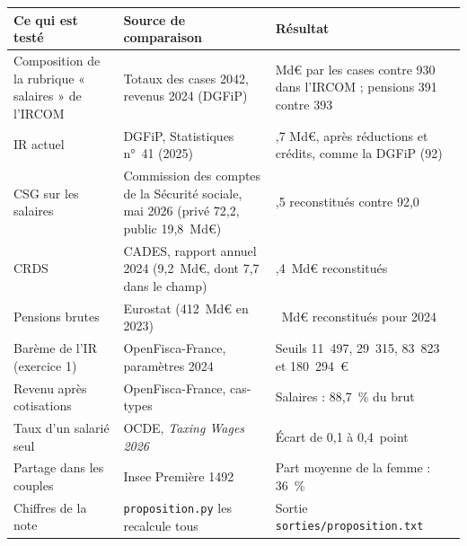 \documentclass[11pt,a4paper]{article}
\begin{document}
\begin{table}[!ht]\centering\scriptsize
\begin{tabularx}{\linewidth}{@{}>{\raggedright\arraybackslash}p{3.2cm}>{\raggedright\arraybackslash}X>{\raggedright\arraybackslash}p{4.1cm}@{}}
\toprule
Ce qui est testé & Source de comparaison & Résultat \\
\midrule
Composition de la rubrique « salaires » de l'IRCOM & Totaux des cases 2042, revenus 2024 (DGFiP) & 925 Md€ par les cases contre 930 dans l'IRCOM ; pensions 391 contre 393 \\
IR actuel & DGFiP, Statistiques n°~41 (2025) & 91,7 Md€, après réductions et crédits, comme la DGFiP (92) \\
CSG sur les salaires & Commission des comptes de la Sécurité sociale, mai 2026 (privé 72,2, public 19,8~Md€) & 91,5 reconstitués contre 92,0 \\
CRDS & CADES, rapport annuel 2024 (9,2~Md€, dont 7,7 dans le champ) & 7,4~Md€ reconstitués \\
Pensions brutes & Eurostat (412~Md€ en 2023) & 406~Md€ reconstitués pour 2024 \\
Barème de l'IR (exercice 1) & OpenFisca-France, paramètres 2024 & Seuils 11~497, 29~315, 83~823 et 180~294~€ \\
Revenu après cotisations & OpenFisca-France, cas-types & Salaires : 88,7~\% du brut \\
Taux d'un salarié seul & OCDE, \emph{Taxing Wages 2026} & Écart de 0,1 à 0,4~point \\
Partage dans les couples & Insee Première 1492 & Part moyenne de la femme : 36~\% \\
Chiffres de la note & \texttt{proposition.py} les recalcule tous & Sortie \texttt{sorties/proposition.txt} \\
\bottomrule
\end{tabularx}
\end{table}
\end{document}
